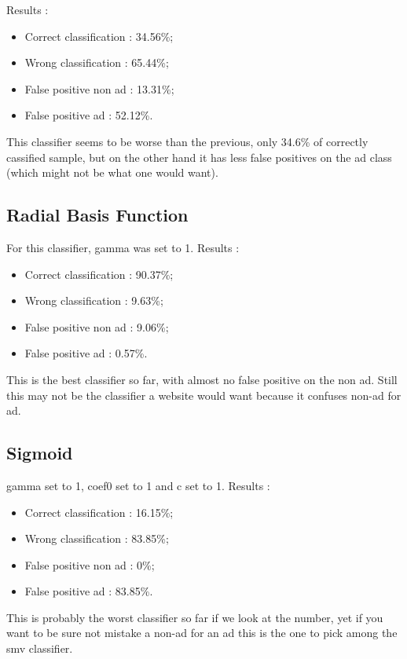 Results :
\begin{itemize}
  \item Correct classification : 34.56\%;
  \item Wrong classification : 65.44\%;
  \item False positive non ad : 13.31\%;
  \item False positive ad : 52.12\%.
\end{itemize}

This classifier seems to be worse than the previous, only 34.6\% of correctly cassified sample, but on the other hand it has less false positives on the ad class (which might not be what one would want).

\subsection{Radial Basis Function}

For this classifier, gamma was set to 1.
Results :
\begin{itemize}
  \item Correct classification : 90.37\%;
  \item Wrong classification : 9.63\%;
  \item False positive non ad : 9.06\%;
  \item False positive ad : 0.57\%.
\end{itemize}

This is the best classifier so far, with almost no false positive on the non ad. Still this may not be the classifier a website would want because it confuses non-ad for ad.


\subsection{Sigmoid}
gamma set to 1, coef0 set to 1 and c set to 1.
Results :
\begin{itemize}
  \item Correct classification : 16.15\%;
  \item Wrong classification : 83.85\%;
  \item False positive non ad : 0\%;
  \item False positive ad : 83.85\%.
\end{itemize}

This is probably the worst classifier so far if we look at the number, yet if you want to be sure not mistake a non-ad for an ad this is the one to pick among the smv classifier.

